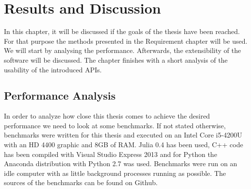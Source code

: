 \section{Results and Discussion}

In this chapter, it will be discussed if the goals of the thesis have been reached.
For that purpose the methods presented in the Requirement chapter will be used. 
We will start by analysing the performance. Afterwards, the extensibility of the software will be discussed.
The chapter finishes with a short analysis of the usability of the introduced \ac{API}s.

\subsection{Performance Analysis}
In order to analyze how close this thesis comes to achieve the desired performance we need to look at some benchmarks.
If not stated otherwise, benchmarks were written for this thesis and executed on an Intel Core i5-4200U with an HD 4400 graphic and 8GB of RAM.
Julia 0.4 has been used, C++ code has been compiled with Visual Studio Express 2013 and for Python the Anaconda distribution with Python 2.7 was used.
Benchmarks were run on an idle computer with as little background processes running as possible.
The sources of the benchmarks can be found on Github\cite{Benchmarks}.

